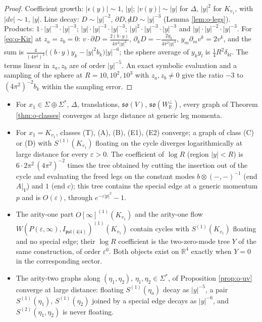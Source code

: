 \begin{proof}
Coefficient growth: $|\epsilon(y)|\sim1$, $|y|$; $|v(y)|\sim|y|$ for $\Delta$, $|y|^2$ for $K_{v_1}$, with $|dv|\sim1$, $|y|$. Line decay: $D\sim|y|^{-2}$, $\partial D,{\not d}D\sim|y|^{-3}$ (Lemma \ref{lem:o-legs}). Products: $1\cdot|y|^{-3}\cdot|y|^{-3}$; $|y|\cdot|y|^{-3}\cdot|y|^{-3}$; $|y|^2\cdot|y|^{-3}\cdot|y|^{-3}$ and $|y|\cdot|y|^{-2}\cdot|y|^{-3}$. For \eqref{eq:o-Kir} at $z_a=z_b=0$: $v\cdot\partial D=\tfrac{2(b\cdot y)}{4\pi^2|y|^2}$, $\partial_kD=-\tfrac{2y_k}{4\pi^2|y|^4}$, $y_m\partial_mv^k=2v^k$, and the sum is $\frac{4}{(4\pi^2)^2}\big((b\cdot y)y_k-|y|^2b_k\big)|y|^{-6}$; the sphere average of $y_ky_l$ is $\tfrac14R^2\delta_{kl}$. The terms linear in $z_a,z_b$ are of order $|y|^{-5}$. An exact symbolic evaluation and a sampling of the sphere at $R=10,10^2,10^3$ with $z_a,z_b\neq0$ give the ratio $-3$ to $(4\pi^2)^{-2}b_k$ within the sampling error.
\end{proof}

\begin{theorem}
\label{thm:o-ir}
\begin{itemize}
\item[(i)] For $x_1\in\Sigma\oplus\Sigma^*$, $\Delta$, translations, $\mathfrak{so}(V)$, $\mathfrak{so}(W_{\mathbb R}^\perp)$, every graph of Theorem \ref{thm:o-classes} converges at large distance at generic leg momenta.
\item[(ii)] For $x_1=K_{v_1}$, classes (T), (A), (B), (E1), (E2) converge; a graph of class (C) or (D) with $S^{(1)}(K_{v_1})$ floating on the cycle diverges logarithmically at large distance for every $\varepsilon>0$. The coefficient of $\log R$ (region $|y|<R$) is $6\cdot2\pi^2\,(4\pi^2)^{-2}$ times the tree obtained by cutting the insertion out of the cycle and evaluating the freed legs on the constant modes $b\otimes(-,-)^{-1}$ (end $A|_V$) and $1$ (end $c$); this tree contains the special edge at a generic momentum $p$ and is $O(\varepsilon)$, through $e^{-\varepsilon|p|^2}-1$.
\item[(iii)] The arity-one part $O[\infty]^{(1)}(K_{v_1})$ and the arity-one flow $W(P(\varepsilon,\infty),I_{\mathfrak{psl}(4|4)})^{(1)}(K_{v_1})$ contain cycles with $S^{(1)}(K_{v_1})$ floating and no special edge; their $\log R$ coefficient is the two-zero-mode tree $Y$ of the same construction, of order $\varepsilon^0$. Both objects exist on $\mathbb R^4$ exactly when $Y=0$ in the corresponding sector.
\item[(iv)] The arity-two graphs along $(\eta_1,\eta_2)$, $\eta_1,\eta_2\in\Sigma^*$, of Proposition \ref{prop:o-uv} converge at large distance: floating $S^{(1)}(\eta_a)$ decay as $|y|^{-5}$, a pair $S^{(1)}(\eta_1)$, $S^{(1)}(\eta_2)$ joined by a special edge decays as $|y|^{-6}$, and $S^{(2)}(\eta_1,\eta_2)$ is never floating.
\end{itemize}
\end{theorem}


